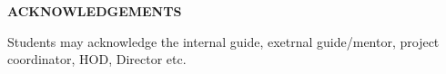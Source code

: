 \begin{center}
\large{\textbf{ACKNOWLEDGEMENTS}}\\
\vspace{1cm}
\end{center}

Students may acknowledge the internal guide, exetrnal guide/mentor, project coordinator, HOD, Director etc.

